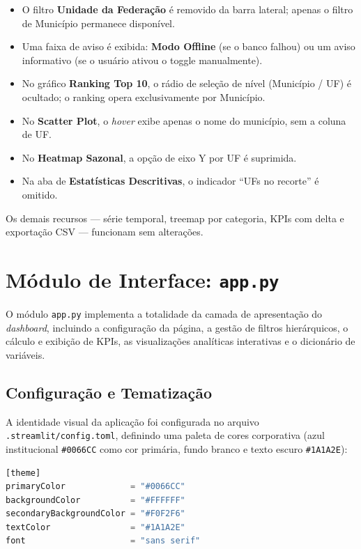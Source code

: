 \documentclass[12pt,a4paper]{report}
\begin{document}
\begin{itemize}
    \item O filtro \textbf{Unidade da Federação} é removido da barra lateral; apenas
    o filtro de Município permanece disponível.
    \item Uma faixa de aviso é exibida: \textbf{Modo Offline} (se o banco falhou)
    ou um aviso informativo (se o usuário ativou o toggle manualmente).
    \item No gráfico \textbf{Ranking Top 10}, o rádio de seleção de nível
    (Município / UF) é ocultado; o ranking opera exclusivamente por Município.
    \item No \textbf{Scatter Plot}, o \textit{hover} exibe apenas o nome do município,
    sem a coluna de UF.
    \item No \textbf{Heatmap Sazonal}, a opção de eixo Y por UF é suprimida.
    \item Na aba de \textbf{Estatísticas Descritivas}, o indicador
    ``UFs no recorte'' é omitido.
\end{itemize}

Os demais recursos — série temporal, treemap por categoria, KPIs com delta e
exportação CSV — funcionam sem alterações.

\section{Módulo de Interface: \texttt{app.py}}

O módulo \texttt{app.py} implementa a totalidade da camada de apresentação do
\textit{dashboard}, incluindo a configuração da página, a gestão de filtros
hierárquicos, o cálculo e exibição de KPIs, as visualizações analíticas interativas
e o dicionário de variáveis.

\subsection{Configuração e Tematização}

A identidade visual da aplicação foi configurada no arquivo
\texttt{.streamlit/config.toml}, definindo uma paleta de cores corporativa (azul
institucional \texttt{\#0066CC} como cor primária, fundo branco e texto escuro
\texttt{\#1A1A2E}):

\begin{lstlisting}[language=Python, numbers=none]
[theme]
primaryColor             = "#0066CC"
backgroundColor          = "#FFFFFF"
secondaryBackgroundColor = "#F0F2F6"
textColor                = "#1A1A2E"
font                     = "sans serif"
\end{lstlisting}
\end{document}
